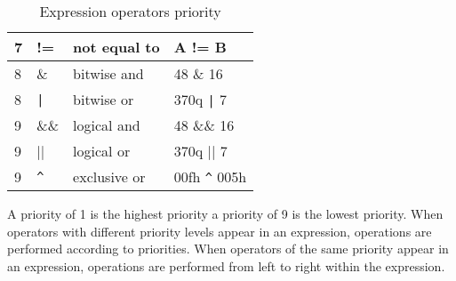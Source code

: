 \begin{table}[h!]
\begin{tabular}{|l|l|l|l|}
                        7              &           !=         & not equal to                 &  A != B              \\\hline
                        8              &           \&         & bitwise and                  & 48 \& 16              \\\hline
                        8              &           \verb'|'         & bitwise or                   & 370q \verb'|' 7             \\\hline
                        9              &           \&\&       & logical and                  & 48 \&\& 16           \\\hline
                        9              &           ||         & logical or                   & 370q || 7            \\\hline
                        9              &           \verb'^'             & exclusive or                  & 00fh \verb'^' 005h            \\\hline
                        \end{tabular}
                        \caption{Expression operators priority}
                \end{table}
        A priority of 1 is the highest priority a priority of 9 is the lowest priority.
        When operators with different priority levels appear in an expression, operations are performed
        according to priorities. When operators of the same priority appear in an expression, operations are performed from left to right within
        the expression.

